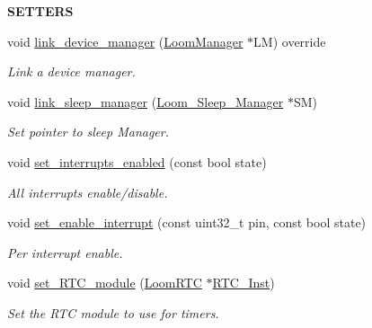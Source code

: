 \begin{Indent}{\bf S\+E\+T\+T\+E\+RS}\par
\begin{DoxyCompactItemize}
\item 
void \hyperlink{class_loom___interrupt___manager_a7415a4ffbeda1358639936cc62969605}{link\+\_\+device\+\_\+manager} (\hyperlink{class_loom_manager}{Loom\+Manager} $\ast$LM) override
\begin{DoxyCompactList}\small\item\em Link a device manager. \end{DoxyCompactList}\item 
void \hyperlink{class_loom___interrupt___manager_a794ec2babdedb928f17862c93b772215}{link\+\_\+sleep\+\_\+manager} (\hyperlink{class_loom___sleep___manager}{Loom\+\_\+\+Sleep\+\_\+\+Manager} $\ast$SM)
\begin{DoxyCompactList}\small\item\em Set pointer to sleep Manager. \end{DoxyCompactList}\item 
void \hyperlink{class_loom___interrupt___manager_a179034c16493d648ad3108ae1152e86b}{set\+\_\+interrupts\+\_\+enabled} (const bool state)
\begin{DoxyCompactList}\small\item\em All interrupts enable/disable. \end{DoxyCompactList}\item 
void \hyperlink{class_loom___interrupt___manager_ac3551b3ce17a6eb7db6885689510be60}{set\+\_\+enable\+\_\+interrupt} (const uint32\+\_\+t pin, const bool state)
\begin{DoxyCompactList}\small\item\em Per interrupt enable. \end{DoxyCompactList}\item 
void \hyperlink{class_loom___interrupt___manager_a971175f7e1109e0317041bde9824591d}{set\+\_\+\+R\+T\+C\+\_\+module} (\hyperlink{class_loom_r_t_c}{Loom\+R\+TC} $\ast$\hyperlink{class_loom___interrupt___manager_af209a82a1929466fa1d00a14733120c6}{R\+T\+C\+\_\+\+Inst})
\begin{DoxyCompactList}\small\item\em Set the R\+TC module to use for timers. \end{DoxyCompactList}\end{DoxyCompactItemize}
\end{Indent}
